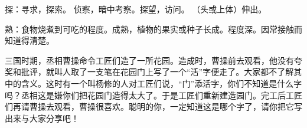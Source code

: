 \documentclass[UTF8]{ctexart}
\begin{document}

\-\hspace{3em} 探：寻求，探索。 侦察，暗中考察。探望，访问。  （头或上体）伸出。





\-\hspace{3em}\setlength{\hangindent}{5.4em} 熟：食物烧煮到可吃的程度。成熟，植物的果实或种子长成。程度深。因常接触而知道得清楚。






三国时期，丞相曹操命令工匠们造了一所花园。造成时，曹操前去观看，他没有夸奖和批评，就叫人取了一支笔在花园门上写了一个“活”字便走了。大家都不了解其中的含义。这时有一个叫杨修的人对工匠们说，“门”添活字，你们不知道是什么字吗？丞相这是嫌你们把花园门造得太大了。于是工匠们重新建造园门。完工后工匠们再请曹操去观看，曹操很喜欢。聪明的你，一定知道这是哪个字了，请你把它写出来与大家分享吧！

\xhx[15cm]
\end{document}
